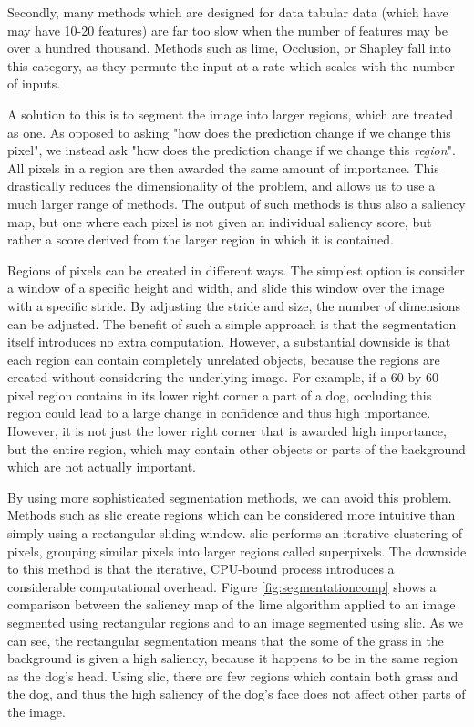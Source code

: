 \documentclass[UKenglish]{uiomasterthesis} %
\theoremstyle{definition}
\begin{document}
Secondly, many methods which are designed for data tabular data (which have may have 10-20 features) are far too slow when the number of features may be over a hundred thousand. Methods such as \ac{lime}, Occlusion, or Shapley fall into this category, as they permute the input at a rate which scales with the number of inputs.

A solution to this is to segment the image into larger regions, which are treated as one. As opposed to asking "how does the prediction change if we change this pixel", we instead ask "how does the prediction change if we change this {\it region}". All pixels in a region are then awarded the same amount of importance. This drastically reduces the dimensionality of the problem, and allows us to use a much larger range of methods. The output of such methods is thus also a saliency map, but one where each pixel is not given an individual saliency score, but rather a score derived from the larger region in which it is contained.

Regions of pixels can be created in different ways. The simplest option is consider a window of a specific height and width, and slide this window over the image with a specific stride. By adjusting the stride and size, the number of dimensions can be adjusted. The benefit of such a simple approach is that the segmentation itself introduces no extra computation. However, a substantial downside is that each region can contain completely unrelated objects, because the regions are created without considering the underlying image. For example, if a 60 by 60 pixel region contains in its lower right corner a part of a dog, occluding this region could lead to a large change in confidence and thus high importance. However, it is not just the lower right corner that is awarded high importance, but the entire region, which may contain other objects or parts of the background which are not actually important.

By using more sophisticated segmentation methods, we can avoid this problem. Methods such as \ac{slic} \cite{slic} create regions which can be considered more intuitive than simply using a rectangular sliding window. \ac{slic} performs an iterative clustering of pixels, grouping similar pixels into larger regions called superpixels. The downside to this method is that the iterative, CPU-bound process introduces a considerable computational overhead. Figure \ref{fig:segmentationcomp} shows a comparison between the saliency map of the \ac{lime} algorithm applied to an image segmented using rectangular regions and to an image segmented using \ac{slic}. As we can see, the rectangular segmentation means that the some of the grass in the background is given a high saliency, because it happens to be in the same region as the dog's head. Using \ac{slic}, there are few regions which contain both grass and the dog, and thus the high saliency of the dog's face does not affect other parts of the image.
\end{document}
